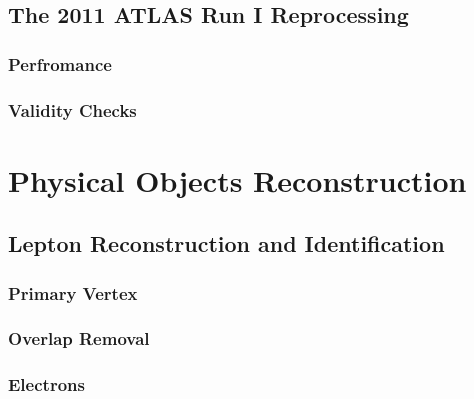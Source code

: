\documentclass[10pt,twoside,cucitura,classica,english,openany]{toptesi}
\begin{document}


\section{The 2011 ATLAS Run I Reprocessing}
\label{sec:2011-atlas-run}



\subsection{Perfromance}
\label{sec:perfromance}



\subsection{Validity Checks}
\label{sec:validity-checks}



\chapter{Physical Objects Reconstruction}
\label{cha:phys-objects-reconst}

\section{Lepton Reconstruction and Identification}
\label{sec:lept-reconstr-ident}



\subsection{Primary Vertex}
\label{sec:primary-vertex}



\subsection{Overlap Removal}
\label{sec:overlap-removal}



\subsection{Electrons}
\label{sec:electrons}


\end{document}
